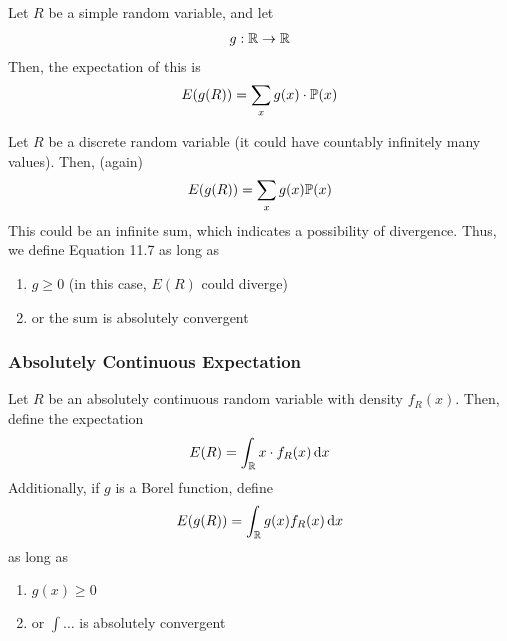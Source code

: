 \begin{definition}
    Let $R$ be a simple random variable, and let
    \begin{align}
        g: \mathbb{R} \to \mathbb{R}
    \end{align}
    Then, the expectation of this is
    \begin{align}
        E(g(R)) = \sum_x g(x) \cdot \mathbb{P}(x)
    \end{align}
\end{definition}

\begin{definition}
    Let $R$ be a discrete random variable (it could have countably infinitely many values). Then, (again)
    \begin{align}
        E(g(R)) = \sum_x g(x) \mathbb{P}(x)
    \end{align}
    This could be an infinite sum, which indicates a possibility of divergence. Thus, we define Equation 11.7 as long as
    \begin{enumerate}
        \item $g \ge 0$ (in this case, $E(R)$ could diverge)
        \item or the sum is absolutely convergent
    \end{enumerate}
\end{definition}

\subsubsection{Absolutely Continuous Expectation}

\begin{definition}
    Let $R$ be an absolutely continuous random variable with density $f_R(x)$. Then, define the expectation
    \begin{align}
        E(R) = \int_{\mathbb{R}} x \cdot f_R(x) \dd{x}
    \end{align}
    Additionally, if $g$ is a Borel function, define
    \begin{align}
        E(g(R)) = \int_{\mathbb{R}} g(x) f_R(x) \dd{x}
    \end{align}
    as long as
    \begin{enumerate}
        \item $g(x) \ge 0$
        \item or $\int \ldots$ is absolutely convergent
    \end{enumerate}
\end{definition}

